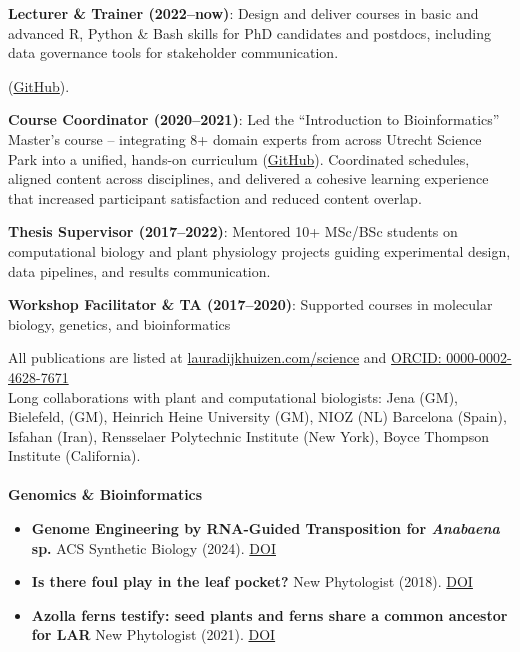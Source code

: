 \documentclass[a4paper,10pt]{article}
\begin{document}
\begin{description}
  \raggedright
  \item \textbf{Lecturer \& Trainer (2022–now)}: Design and deliver courses in 
    basic and advanced R, Python \& Bash skills for PhD candidates and postdocs, 
    including data governance tools for stakeholder communication.

    (\href{https://github.com/lauralwd/professional_education}{GitHub}).
  \item \textbf{Course Coordinator (2020–2021)}: Led the “Introduction to Bioinformatics” Master’s course 
    -- integrating 8+ domain experts from across Utrecht Science Park into a unified, hands-on curriculum 
    (\href{https://lauralwd.github.io/metagenomicspractical/}{GitHub}). 
    Coordinated schedules, aligned content across disciplines, 
    and delivered a cohesive learning experience that increased participant satisfaction and reduced content overlap.
  \item \textbf{Thesis Supervisor (2017–2022)}: Mentored 10+ MSc/BSc students on computational biology and 
    plant physiology projects guiding experimental design, data pipelines, and results communication.
  \item \textbf{Workshop Facilitator \& TA (2017–2020)}: Supported courses in molecular biology, genetics, and bioinformatics
\end{description}

\vfill



\noindent All publications are listed at \href{https://lauradijkhuizen.com/science}{lauradijkhuizen.com/science}  and 
\textcolor[HTML]{A6CE39}{\faOrcid}\href{https://orcid.org/0000-0002-4628-7671}{ORCID: 0000-0002-4628-7671}
\\
\noindent Long collaborations with plant and computational biologists: Jena (GM), Bielefeld, (GM), Heinrich Heine University (GM), NIOZ (NL) Barcelona (Spain), Isfahan (Iran), Rensselaer Polytechnic Institute (New York), Boyce Thompson Institute (California). \\
\\
\noindent\textbf{Genomics \& Bioinformatics}
  \begin{itemize}
    \item \textbf{Genome Engineering by RNA-Guided Transposition for \textit{Anabaena} sp.}  
      ACS Synthetic Biology (2024). \href{https://doi.org/10.1021/acssynbio.3c00583}{DOI}
    \item \textbf{Is there foul play in the leaf pocket?}  
      New Phytologist (2018). \href{https://doi.org/10.1111/nph.14843}{DOI}
      \item \textbf{Azolla ferns testify: seed plants and ferns share a common ancestor for LAR}  
        New Phytologist (2021). \href{https://doi.org/10.1111/nph.16896}{DOI}
  \end{itemize}
\end{document}
